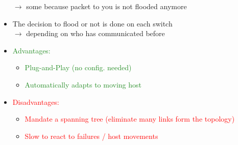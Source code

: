 \documentclass[a4paper, fontsize=8pt, landscape, DIV=1]{scrartcl}
\begin{document}
\begin{multicols*}{4}
\begin{itemize}[noitemsep]
				$\rightarrow$ some because packet to you is not flooded anymore
				\item The decision to flood or not is done on each switch\\ $\rightarrow$ depending on who has communicated before 
			\end{itemize}
			\begin{itemize}[noitemsep]
				\item \textcolor{ForestGreen}{Advantages:}
				\begin{itemize}
					\item \textcolor{ForestGreen}{Plug-and-Play (no config. needed)} 
					\item \textcolor{ForestGreen}{Automatically adapts to moving host}
				\end{itemize}
				\item \textcolor{red}{Disadvantages:}
				\begin{itemize}
					\item \textcolor{red}{Mandate a spanning tree (eliminate many links form the topology)}
					\item \textcolor{red}{Slow to react to failures / host movements}
				\end{itemize} 
			\end{itemize}
			

\end{multicols*}
\end{document}
